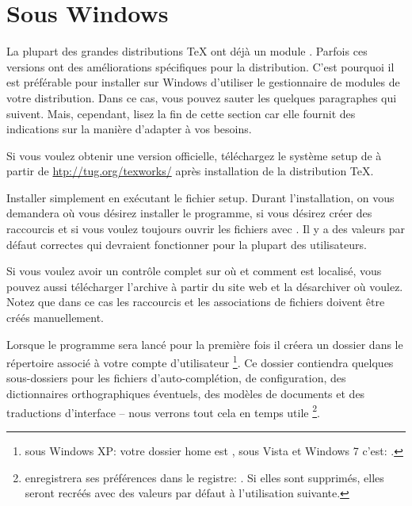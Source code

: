 \section{Sous Windows}

La plupart des grandes distributions \TeX{} ont déjà un module \Tw. Parfois ces versions ont des améliorations spécifiques pour la distribution. C'est pourquoi il est préférable pour installer \Tw{} sur Windows d'utiliser le gestionnaire de modules de votre distribution. Dans ce cas, vous pouvez sauter les quelques paragraphes qui suivent. Mais, cependant, lisez la fin de cette section car elle fournit des indications sur la manière d'adapter \Tw{} à vos besoins.

Si vous voulez obtenir une version \og officielle\fg, téléchargez le système setup de \Tw{} à partir de  \url{htp://tug.org/texworks/}  après installation de la distribution \TeX.

Installer simplement \Tw{} en exécutant le fichier setup. Durant l'installation, on vous demandera où vous désirez installer le programme, si vous désirez créer des raccourcis et si vous voulez toujours ouvrir les fichiers  avec \Tw. Il y a des valeurs par défaut correctes qui devraient fonctionner pour la plupart des utilisateurs.

Si vous voulez avoir un contrôle complet sur où et comment \Tw{} est localisé, vous pouvez aussi télécharger l'archive  à partir du site web et la désarchiver où voulez. Notez que dans ce cas les raccourcis et les associations de fichiers doivent être créés manuellement.

\urldef{\TwRegistryPath}

Lorsque le programme sera lancé pour la première fois il créera un dossier  dans le répertoire associé à votre compte d'utilisateur \footnote{sous Windows XP: votre dossier home est , sous Vista et Windows 7 c'est: .}. Ce dossier contiendra quelques sous-dossiers pour les fichiers d'auto-complé\-tion, de configuration, des dictionnaires orthographiques éventuels, des modèles de documents et des traductions d'interface -- nous verrons tout cela en temps utile \footnote{\Tw{} enregistrera ses préférences dans le registre:
\TwRegistryPath. Si elles sont supprimés, elles seront recréés avec des valeurs par défaut à l'utilisation suivante.}.

